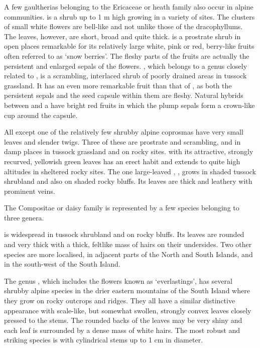 A few gaultherias belonging to the Ericaceae or heath family also occur in alpine communities.  is a shrub up to 1 m high growing in a variety of sites.
The clusters of small white flowers are bell-like and not unlike those of the dracophyllums.
The leaves, however, are short, broad and quite thick.  is a prostrate shrub in open places remarkable for its relatively large white, pink or red, berry-like fruits often referred to as `snow berries'.
The fleshy parts of the fruits are actually the persistent and enlarged sepals of the flowers. , which belongs to a genus closely related to , is a scrambling, interlaced shrub of poorly drained areas in tussock grassland.
It has an even more remarkable fruit than that of , as both the persistent sepals and the seed capsule within them are fleshy.
Natural hybrids between  and a  have bright red fruits in which the plump sepals form a crown-like cup around the capsule.

All except one of the relatively few shrubby alpine coprosmas have very small leaves and slender twigs.
Three of these are prostrate and scrambling,   and  in damp places in tussock grassland and   on rocky sites.  with its attractive, strongly recurved, yellowish green leaves has an erect habit and extends to quite high altitudes in sheltered rocky sites.
The one large-leaved , , grows in shaded tussock shrubland  and also on shaded rocky bluffs.
Its leaves are thick and leathery with prominent veins.

The Compositae or daisy family is represented by a few species belonging to three genera.

 is widespread in tussock shrubland and on rocky bluffs.
Its leaves are rounded and very thick with a thick, feltlike mass of hairs on their undersides.
Two other species are more localised,  in adjacent parts of the North and South Islands, and  in the south-west of the South Island.

The genus , which includes the flowers known as `everlastings', has several shrubby alpine species in the drier eastern mountains of the South Island where they grow on rocky outcrops and ridges.
They all have a similar distinctive appearance with scale-like, but somewhat swollen, strongly convex leaves closely pressed to the stems.
The rounded backs of the leaves may be very shiny and each leaf is surrounded by a dense mass of white hairs.
The most robust and striking species is  with cylindrical stems up to 1 cm in diameter.

